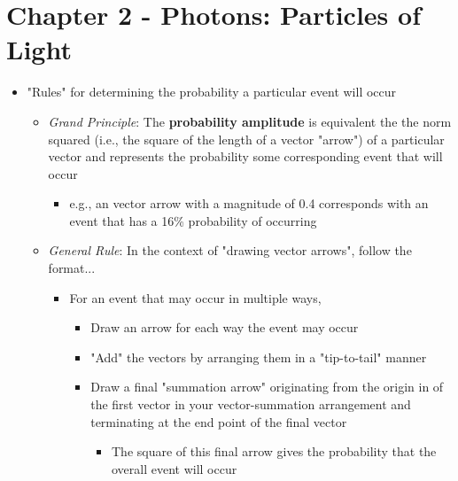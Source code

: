 \documentclass[a4paper]{article}
\begin{document}
    \section*{Chapter 2 - Photons: Particles of Light}
        \begin{itemize}
            \item "Rules" for determining the probability a particular event will occur
            \begin{itemize}
                \item \textit{Grand Principle}: The \textbf{probability amplitude} is equivalent the the norm squared (i.e., the square of the length of a vector "arrow") of a particular vector and represents the probability some corresponding event that will occur
                \begin{itemize}
                    \item e.g., an vector arrow with a magnitude of 0.4 corresponds with an event that has a 16\% probability of occurring
                \end{itemize}
                \item \textit{General Rule}: In the context of "drawing vector arrows", follow the format...
                    \begin{itemize}
                        \item For an event that may occur in multiple ways,
                        \begin{itemize}
                            \item Draw an arrow for each way the event may occur
                            \item "Add" the vectors by arranging them in a "tip-to-tail" manner
                            \item Draw a final "summation arrow" originating from the origin in of the first vector in your vector-summation arrangement and terminating at the end point of the final vector 
                                \begin{itemize}
                                    \item The square of this final arrow gives the probability that the overall event will occur
                                \end{itemize}
                        \end{itemize}
                    \end{itemize}
            \end{itemize}
        \end{itemize}
\end{document}
